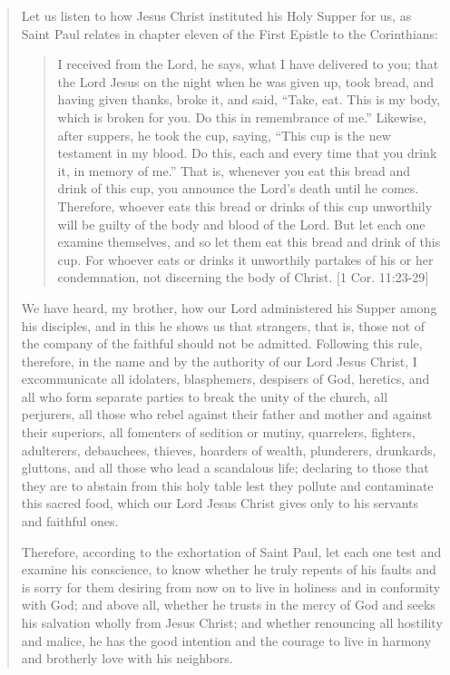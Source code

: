 \documentclass[
]{book}
\begin{document}
\begin{quote}
Let us listen to how Jesus Christ instituted his Holy Supper for us, as Saint Paul relates in chapter eleven of the First Epistle to the Corinthians:

\begin{quote}
I received from the Lord, he says, what I have delivered to you; that the Lord Jesus on the night when he was given up, took bread, and having given thanks, broke it, and said, ``Take, eat. This is my body, which is broken for you. Do this in remembrance of me.'' Likewise, after suppers, he took the cup, saying, ``This cup is the new testament in my blood. Do this, each and every time that you drink it, in memory of me.'' That is, whenever you eat this bread and drink of this cup, you announce the Lord's death until he comes. Therefore, whoever eats this bread or drinks of this cup unworthily will be guilty of the body and blood of the Lord. But let each one examine themselves, and so let them eat this bread and drink of this cup. For whoever eats or drinks it unworthily partakes of his or her condemnation, not discerning the body of Christ. {[}1 Cor. 11:23-29{]}
\end{quote}

We have heard, my brother, how our Lord administered his Supper among his disciples, and in this he shows us that strangers, that is, those not of the company of the faithful should not be admitted. Following this rule, therefore, in the name and by the authority of our Lord Jesus Christ, I excommunicate all idolaters, blasphemers, despisers of God, heretics, and all who form separate parties to break the unity of the church, all perjurers, all those who rebel against their father and mother and against their superiors, all fomenters of sedition or mutiny, quarrelers, fighters, adulterers, debauchees, thieves, hoarders of wealth, plunderers, drunkards, gluttons, and all those who lead a scandalous life; declaring to those that they are to abstain from this holy table lest they pollute and contaminate this sacred food, which our Lord Jesus Christ gives only to his servants and faithful ones.

Therefore, according to the exhortation of Saint Paul, let each one test and examine his conscience, to know whether he truly repents of his faults and is sorry for them desiring from now on to live in holiness and in conformity with God; and above all, whether he trusts in the mercy of God and seeks his salvation wholly from Jesus Christ; and whether renouncing all hostility and malice, he has the good intention and the courage to live in harmony and brotherly love with his neighbors.


\end{quote}
\end{document}
